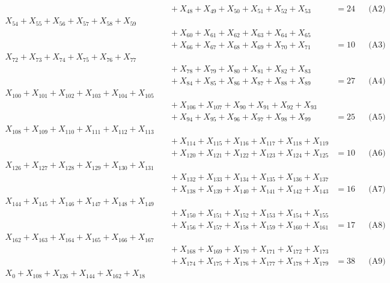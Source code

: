 \documentclass[a4paper,10pt]{article}
\begin{document}
{\begin{align}
&\quad  + X_{48} + X_{49} + X_{50} + X_{51} + X_{52} + X_{53} &= 24 && \text{(A2)} \\
X_{54} + X_{55} + X_{56} + X_{57} + X_{58} + X_{59} \\[0.5ex]
&\quad  + X_{60} + X_{61} + X_{62} + X_{63} + X_{64} + X_{65} \\[0.5ex]
&\quad  + X_{66} + X_{67} + X_{68} + X_{69} + X_{70} + X_{71} &= 10 && \text{(A3)} \\
X_{72} + X_{73} + X_{74} + X_{75} + X_{76} + X_{77} \\[0.5ex]
&\quad  + X_{78} + X_{79} + X_{80} + X_{81} + X_{82} + X_{83} \\[0.5ex]
&\quad  + X_{84} + X_{85} + X_{86} + X_{87} + X_{88} + X_{89} &= 27 && \text{(A4)} \\
X_{100} + X_{101} + X_{102} + X_{103} + X_{104} + X_{105} \\[0.5ex]
&\quad  + X_{106} + X_{107} + X_{90} + X_{91} + X_{92} + X_{93} \\[0.5ex]
&\quad  + X_{94} + X_{95} + X_{96} + X_{97} + X_{98} + X_{99} &= 25 && \text{(A5)} \\
X_{108} + X_{109} + X_{110} + X_{111} + X_{112} + X_{113} \\[0.5ex]
&\quad  + X_{114} + X_{115} + X_{116} + X_{117} + X_{118} + X_{119} \\[0.5ex]
&\quad  + X_{120} + X_{121} + X_{122} + X_{123} + X_{124} + X_{125} &= 10 && \text{(A6)} \\
X_{126} + X_{127} + X_{128} + X_{129} + X_{130} + X_{131} \\[0.5ex]
&\quad  + X_{132} + X_{133} + X_{134} + X_{135} + X_{136} + X_{137} \\[0.5ex]
&\quad  + X_{138} + X_{139} + X_{140} + X_{141} + X_{142} + X_{143} &= 16 && \text{(A7)} \\
X_{144} + X_{145} + X_{146} + X_{147} + X_{148} + X_{149} \\[0.5ex]
&\quad  + X_{150} + X_{151} + X_{152} + X_{153} + X_{154} + X_{155} \\[0.5ex]
&\quad  + X_{156} + X_{157} + X_{158} + X_{159} + X_{160} + X_{161} &= 17 && \text{(A8)} \\
X_{162} + X_{163} + X_{164} + X_{165} + X_{166} + X_{167} \\[0.5ex]
&\quad  + X_{168} + X_{169} + X_{170} + X_{171} + X_{172} + X_{173} \\[0.5ex]
&\quad  + X_{174} + X_{175} + X_{176} + X_{177} + X_{178} + X_{179} &= 38 && \text{(A9)} \\
X_{0} + X_{108} + X_{126} + X_{144} + X_{162} + X_{18} \\[0.5ex]

\end{align}}
\end{document}
